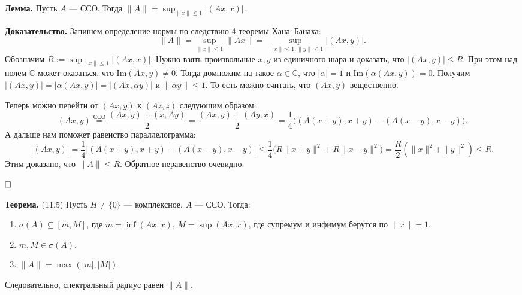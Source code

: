 \documentclass[12pt, a4paper]{article}
\newcommand{\QED}{$\hfill\square$}
\renewcommand{\le}{\leqslant}  %
\renewcommand{\subset}{\subseteq}   %
\begin{document}
\textbf{Лемма.} Пусть $A$ --- ССО. Тогда $\|A\| = \sup_{\|x\| \le 1} |(Ax, x)|$.

\textbf{Доказательство.} Запишем определение нормы по следствию 4 теоремы Хана--Банаха: 
\[
    \|A\| = \sup_{\|x\| \le 1} \|Ax\| = \sup_{\|x\| \le 1, \|y\| \le 1} |(Ax, y)|.
\]
Обозначим $R := \sup_{\|x\| \le 1} |(Ax, x)|$. Нужно взять произвольные $x, y$ из единичного шара и доказать, что $|(Ax, y)| \le R$. При этом над полем $\mathbb{C}$ может оказаться, что $\mathrm{Im}(Ax, y) \neq 0$. Тогда домножим на такое $\alpha \in \mathbb{C}$, что $|\alpha| = 1$ и $\mathrm{Im} (\alpha(Ax, y)) = 0$. Получим $|(Ax, y)| = |\alpha(Ax, y)| = |(Ax, \overline\alpha y)|$ и $\|\overline\alpha y\| \le 1$. То есть можно считать, что $(Ax, y)$ вещественно.

Теперь можно перейти от $(Ax, y)$ к $(Az, z)$ следующим образом:
\[
    (Ax, y) \overset{\text{ССО}}{=} \frac{(Ax, y) + (x, Ay)}{2} = \frac{(Ax, y) + (Ay, x)}{2} = \frac{1}{4}\big((A(x+y), x+y) - (A(x-y), x-y)\big).
\]
А дальше нам поможет равенство параллелограмма:
\[
    |(Ax, y)| = \frac{1}{4}\big|(A(x+y), x+y) - (A(x-y), x-y)\big| \le \frac{1}{4}\big(R\|x+y\|^2 + R\|x-y\|^2\big) = \frac{R}{2}(\|x\|^2 + \|y\|^2) \le R.
\]
Этим доказано, что $\|A\| \le R$. Обратное неравенство очевидно.

\QED

 \label{th:11-5} \textbf{Теорема.} (11.5) Пусть $H \neq \{0\}$ --- комплексное, $A$ --- ССО.
Тогда:
\begin{enumerate}
    \item $\sigma(A) \subset [m, M]$, где $m = \inf (Ax, x)$, $M = \sup (Ax, x)$, где супремум и инфимум берутся по $\|x\| = 1$.
    \item $m, M \in \sigma(A)$.
    \item $\|A\| = \max(|m|, |M|)$.
\end{enumerate}
Следовательно, спектральный радиус равен $\|A\|$.
\end{document}
